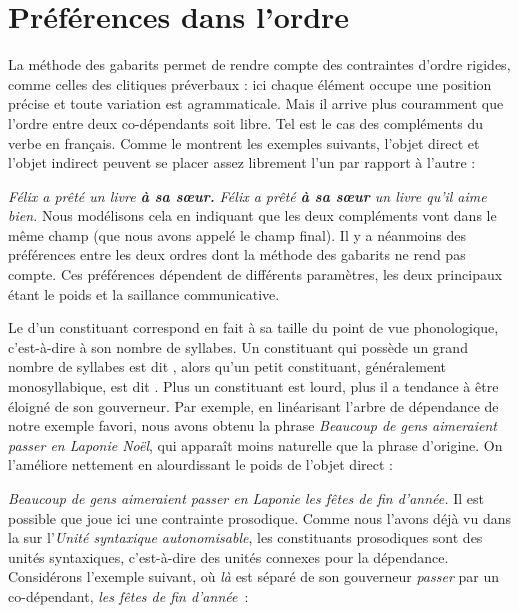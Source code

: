 \section{Préférences dans l’ordre}\label{sec:3.5.21}

La méthode des gabarits permet de rendre compte des contraintes d’ordre rigides, comme celles des clitiques préverbaux : ici chaque élément occupe une position précise et toute variation est agrammaticale. Mais il arrive plus couramment que l’ordre entre deux co-dépendants soit libre. Tel est le cas des compléments du verbe en français. Comme le montrent les exemples suivants, l’objet direct et l’objet indirect peuvent se placer assez librement l’un par rapport à l’autre :

\ea \ea \textit{{Félix a prêté} un livre \textbf{{à sa sœur.}}}
    \ex \textit{{Félix a prêté} \textbf{{à sa sœur}} un livre qu’il aime bien.}
    \z
\z
Nous modélisons cela en indiquant que les deux compléments vont dans le même champ (que nous avons appelé le champ final). Il y a néanmoins des préférences entre les deux ordres dont la méthode des gabarits ne rend pas compte. Ces préférences dépendent de différents paramètres, les deux principaux étant le poids et la saillance communicative.

Le  d’un constituant correspond en fait à sa taille du point de vue phonologique, c’est-à-dire à son nombre de syllabes. Un constituant qui possède un grand nombre de syllabes est dit , alors qu’un petit constituant, généralement monosyllabique, est dit . Plus un constituant est lourd, plus il a tendance à être éloigné de son gouverneur. Par exemple, en linéarisant l’arbre de dépendance de notre exemple favori, nous avons obtenu la phrase \textit{Beaucoup de gens aimeraient passer en Laponie Noël}, qui apparaît moins naturelle que la phrase d’origine. On l’améliore nettement en alourdissant le poids de l’objet direct :

\ea
    {\itshape Beaucoup de gens aimeraient passer en Laponie les fêtes de fin d’année.}
\z
Il est possible que joue ici une contrainte prosodique. Comme nous l’avons déjà vu dans la  sur l’\textit{Unité syntaxique autonomisable}, les constituants prosodiques sont des unités syntaxiques, c’est-à-dire des unités connexes pour la dépendance. Considérons l’exemple suivant, où \textit{là} est séparé de son gouverneur \textit{passer} par un co-dépendant, \textit{les fêtes de fin d’année~}:

